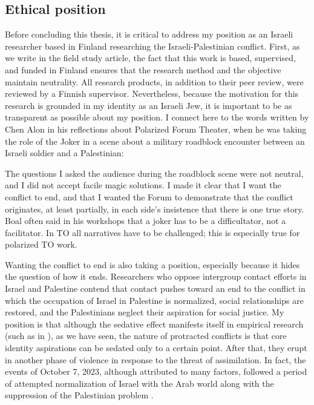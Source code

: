 \documentclass[dissertation,math,vertlayout,pdfa,colorlinks]{aaltoseries}
\begin{document}
\subsection{Ethical position}
Before concluding this thesis, it is critical to address my position as an Israeli researcher based in Finland researching the Israeli-Palestinian conflict. First, as we write in the field study article, the fact that this work is based, supervised, and funded in Finland ensures that the research method and the objective maintain neutrality. All research products, in addition to their peer review, were reviewed by a Finnish supervisor. Nevertheless, because the motivation for this research is grounded in my identity as an Israeli Jew, it is important to be as transparent as possible about my position. I connect here to the words written by Chen Alon in his reflections about Polarized Forum Theater, when he was taking the role of the Joker in a scene about a military roadblock encounter between an Israeli soldier and a Palestinian:
\begin{displayquote}
The questions I asked the audience during the roadblock scene were not neutral, and I did not accept facile magic solutions. I made it clear that I want the conflict to end, and that I wanted the Forum to demonstrate that the conflict originates, at least partially, in each side's insistence that there is one true story. Boal often said in his workshops that a joker has to be a difficultator, not a facilitator. In TO all narratives have to be challenged; this is especially true for polarized TO work.
\end{displayquote}
Wanting the conflict to end is also taking a position, especially because it hides the question of how it ends. Researchers who oppose intergroup contact efforts in Israel and Palestine contend that contact pushes toward an end to the conflict in which the occupation of Israel in Palestine is normalized, social relationships are restored, and the Palestinians neglect their aspiration for social justice. My position is that although the sedative effect manifests itself in empirical research (such as in \cite{albzourTalkingSegregationWall2022}), as we have seen, the nature of protracted conflicts is that core identity aspirations can be sedated only to a certain point. After that, they erupt in another phase of violence in response to the threat of assimilation. In fact, the events of October 7, 2023, although attributed to many factors, followed a period of attempted normalization of Israel with the Arab world along with the suppression of the Palestinian problem \cite{fraihatUnderstandingOctober7th2024}. 
\end{document}
